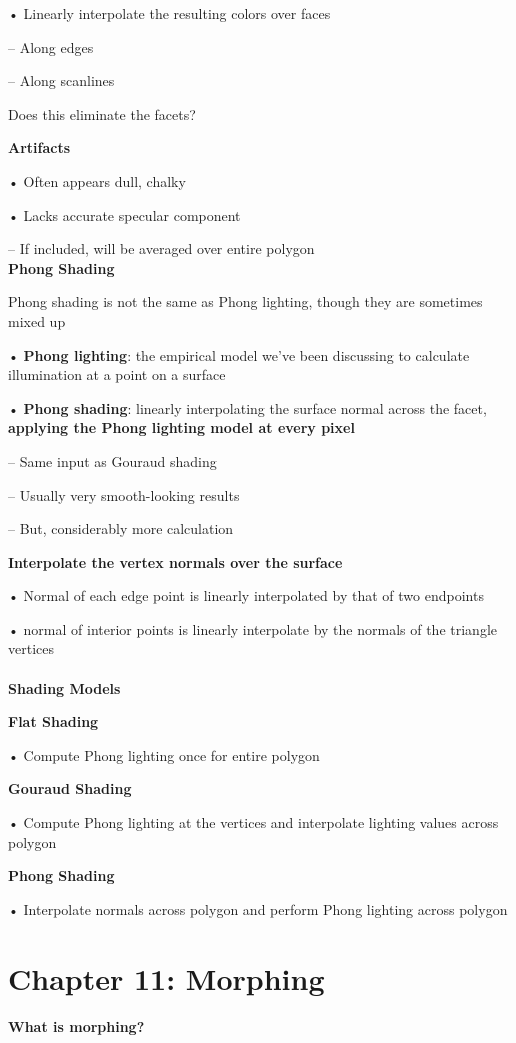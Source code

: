 \documentclass[]{report}
\begin{document}
• Linearly interpolate the resulting colors over faces

– Along edges

– Along scanlines

Does this eliminate the facets?

\textbf{Artifacts}

• Often appears dull, chalky

• Lacks accurate specular component

– If included, will be averaged over entire polygon\\
\textbf{Phong Shading}

Phong shading is not the same as Phong lighting, though
they are sometimes mixed up

• \textbf{Phong lighting}: the empirical model we’ve been discussing
to calculate illumination at a point on a surface

• \textbf{Phong shading}: linearly interpolating the surface normal
across the facet, \textbf{applying the Phong lighting model at
every pixel}

– Same input as Gouraud shading

– Usually very smooth-looking results

– But, considerably more calculation

\textbf{Interpolate the vertex normals over the surface}

• Normal of each edge point is linearly
interpolated by that of two endpoints

• normal of interior points is
linearly interpolate by the
normals of the triangle
vertices\\\\
\textbf{Shading Models}

\textbf{Flat Shading}

• Compute Phong lighting once for 
entire polygon

\textbf{Gouraud Shading}

• Compute Phong lighting at the vertices and interpolate
lighting values across polygon

\textbf{Phong Shading}

• Interpolate normals across polygon and perform Phong
lighting across polygon\\


\section*{Chapter 11: Morphing}
\textbf{What is morphing?}
\end{document}
